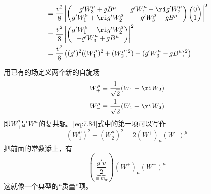 \begin{equation}
\begin{aligned}
& = \frac{v^2}{8} \left|\begin{pmatrix}
g'W_3^\mu+gB^\mu & g'W_1^\mu-\ri g'W_2^\mu \\ g'W_1^\mu+\ri g'W_2^\mu & -g'W_3^\mu+gB^\mu
\end{pmatrix}\begin{pmatrix} 0 \\ 1 \end{pmatrix}\right|^2 \\
& = \frac{v^2}{8} \left|\begin{pmatrix}
g'W_1^\mu-\ri g'W_2^\mu \\  -g'W_3^\mu+gB^\mu
\end{pmatrix}\right|^2 \\
& = \frac{v^2}{8} \left((g')^2((W_1^\mu)^2+ (W_2^\mu)^2) +  (g'W_3^\mu-gB^\mu)^2\right)
\end{aligned}
\label{eq:7.84}
\end{equation}

用已有的场定义两个新的自旋场
\begin{eqnarray}
W_+^\mu &\equiv \frac{1}{\sqrt{2}}(W_1-\ri W_2) \\
W_-^\mu &\equiv \frac{1}{\sqrt{2}}(W_1+\ri W_2)
\end{eqnarray}
即$W_+^\mu$是$W_-^\mu$的复共轭。\ref{eq:7.84}式中的第一项可以写作
\begin{equation}
(W_1^\mu)^2+ (W_2^\mu)^2 = 2 (W^+)_\mu(W^-)^\mu
\end{equation}
把前面的常数添上，有
\begin{equation}
\left(\underbrace{\frac{g'v}{2}}_{\equiv m_W}\right)(W^+)_\mu(W^-)^\mu
\end{equation}
这就像一个典型的“质量”项。

